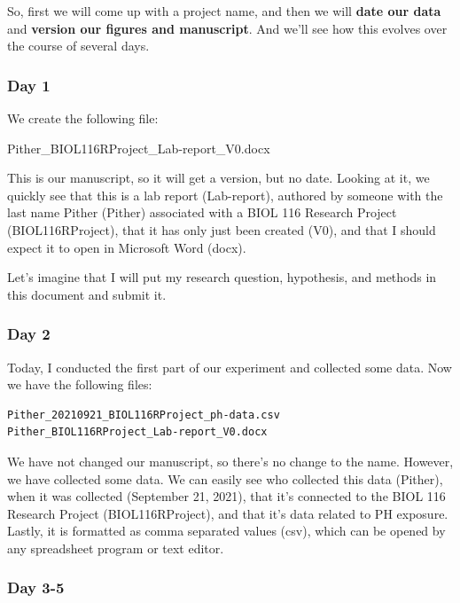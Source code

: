 \documentclass[
]{book}
\begin{document}
So, first we will come up with a project name, and then we will \textbf{date our data} and \textbf{version our figures and manuscript}. And we'll see how this evolves over the course of several days.

\subsubsection*{Day 1}\label{day-1}

We create the following file:

Pither\_BIOL116RProject\_Lab-report\_V0.docx

This is our manuscript, so it will get a version, but no date. Looking at it, we quickly see that this is a lab report (Lab-report), authored by someone with the last name Pither (Pither) associated with a BIOL 116 Research Project (BIOL116RProject), that it has only just been created (V0), and that I should expect it to open in Microsoft Word (docx).

Let's imagine that I will put my research question, hypothesis, and methods in this document and submit it.

\subsubsection*{Day 2}\label{day-2}

Today, I conducted the first part of our experiment and collected some data. Now we have the following files:

\begin{verbatim}
Pither_20210921_BIOL116RProject_ph-data.csv
Pither_BIOL116RProject_Lab-report_V0.docx
\end{verbatim}

We have not changed our manuscript, so there's no change to the name. However, we have collected some data. We can easily see who collected this data (Pither), when it was collected (September 21, 2021), that it's connected to the BIOL 116 Research Project (BIOL116RProject), and that it's data related to PH exposure. Lastly, it is formatted as comma separated values (csv), which can be opened by any spreadsheet program or text editor.

\subsubsection*{Day 3-5}\label{day-3-5}
\end{document}
